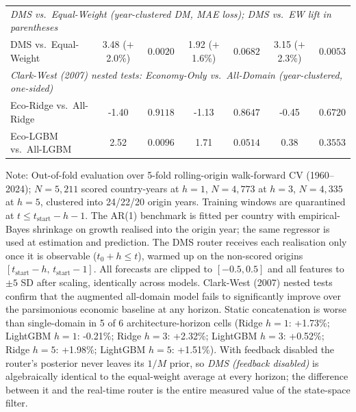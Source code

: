 \begin{table}[ht]
{\begin{tabular}{lcccccc}
\midrule
\multicolumn{7}{l}{\footnotesize \textit{DMS vs.\ Equal-Weight (year-clustered DM, MAE loss); DMS vs.\ EW lift in parentheses}} \\
\quad DMS vs.\ Equal-Weight & 3.48 ($+$2.0\%) & $0.0020$ & 1.92 ($+$1.6\%) & $0.0682$ & 3.15 ($+$2.3\%) & $0.0053$ \\
\midrule
\multicolumn{7}{l}{\footnotesize \textit{Clark-West (2007) nested tests: Economy-Only vs.\ All-Domain (year-clustered, one-sided)}} \\
\quad Eco-Ridge vs.\ All-Ridge & -1.40 & $0.9118$ & -1.13 & $0.8647$ & -0.45 & $0.6720$ \\
\quad Eco-LGBM vs.\ All-LGBM & 2.52 & $0.0096$ & 1.71 & $0.0514$ & 0.38 & $0.3553$ \\
\bottomrule
\end{tabular}%
}
\begin{flushleft}
\footnotesize Note: Out-of-fold evaluation over 5-fold rolling-origin walk-forward CV (1960--2024); $N=5,211$ scored country-years at $h=1$, $N=4,773$ at $h=3$, $N=4,335$ at $h=5$, clustered into 24/22/20 origin years. Training windows are quarantined at $t \le t_{\text{start}} - h - 1$. The AR(1) benchmark is fitted per country with empirical-Bayes shrinkage on growth realised into the origin year; the same regressor is used at estimation and prediction. The DMS router receives each realisation only once it is observable ($t_0 + h \le t$), warmed up on the non-scored origins $[t_{\text{start}} - h,\, t_{\text{start}} - 1]$. All forecasts are clipped to $[-0.5, 0.5]$ and all features to $\pm 5$ SD after scaling, identically across models. Clark-West (2007) nested tests confirm that the augmented all-domain model fails to significantly improve over the parsimonious economic baseline at any horizon. Static concatenation is worse than single-domain in 5 of 6 architecture-horizon cells (Ridge $h=1$: +1.73\%; LightGBM $h=1$: -0.21\%; Ridge $h=3$: +2.32\%; LightGBM $h=3$: +0.52\%; Ridge $h=5$: +1.98\%; LightGBM $h=5$: +1.51\%). With feedback disabled the router's posterior never leaves its $1/M$ prior, so \textit{DMS (feedback disabled)} is algebraically identical to the equal-weight average at every horizon; the difference between it and the real-time router is the entire measured value of the state-space filter.
\end{flushleft}
\end{table}